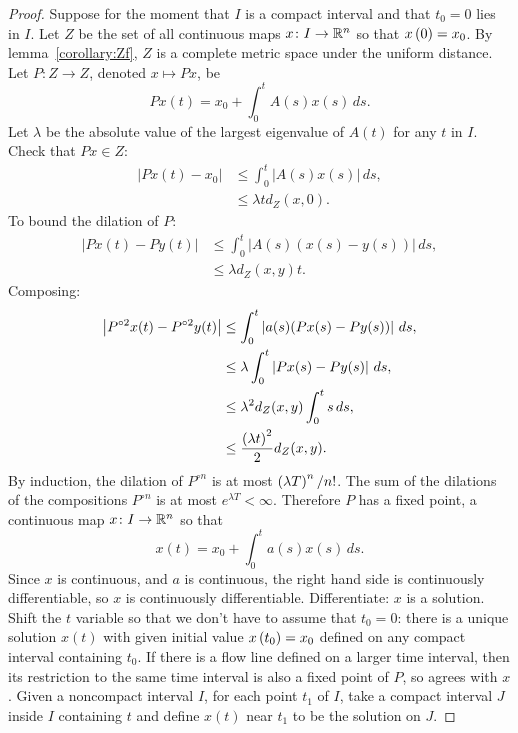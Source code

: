 \begin{proof}
Suppose for the moment that \(I\) is a compact interval and that \(t_0=0\) lies in \(I\).
Let \(Z\) be the set of all continuous maps \(x \colon I \to \mathbb{R}^{n}\) so that \(x\left(0\right)=x_0\).
By lemma~\vref{corollary:Zf}, \(Z\) is a complete metric space under the uniform distance.
Let \(P \colon Z \to Z\), denoted \(x \mapsto Px\), be
\[
Px(t) = x_0 + \int_0^t A(s) x(s) \, ds.
\]
Let \(\lambda\) be the absolute value of the largest eigenvalue of \(A(t)\) for any \(t\) in \(I\).
Check that \(Px \in Z\):
\begin{align*}
\left|Px(t) - x_0\right| 
&
\le
\int_0^t \left|A(s)x(s)\right| \, ds,
\\
&\le
\lambda t d_Z(x,0).
\end{align*}
To bound the dilation of \(P\):
\begin{align*}
\left|Px(t)-Py(t)\right|
&\le
\int_0^t \left|A(s)(x(s)-y(s))\right| \, ds,
\\
&\le
\lambda d_Z(x,y) t.
\end{align*}
Composing:
\begin{align*}
\left|P^{\circ 2}x(t)-P^{\circ 2}y(t)\right|
&\le
\int_0^t \left|a(s)(Px(s)-Py(s))\right| \, ds,
\\
&\le
\lambda \int_0^t \left|Px(s)-Py(s)\right| \, ds,
\\
&\le
\lambda^2 d_Z(x,y) \int_0^t s \, ds,
\\
&\le \frac{\left(\lambda t\right)^2}{2} d_Z(x,y).
\end{align*}
By induction, the dilation of \(P^{\circ n}\) is at most \(\left(\lambda T\right)^n/n!\).
The sum of the dilations of the compositions \(P^{\circ n}\) is at most \(e^{\lambda T} < \infty\).
Therefore \(P\) has a fixed point, a continuous map \(x \colon I \to \mathbb{R}^{n}\) so that 
\[
x(t) = x_0 + \int_0^t a(s)x(s) \, ds.
\]
Since \(x\) is continuous, and \(a\) is continuous, the right hand side is continuously differentiable, so \(x\) is continuously differentiable.
Differentiate: \(x\) is a solution.
Shift the \(t\) variable so that we don't have to assume that \(t_0=0\): there is a unique solution \(x(t)\) with given initial value \(x\left(t_0\right)=x_0\) defined on any compact interval containing \(t_0\).
If there is a flow line defined on a larger time interval, then its restriction to the same time interval is also a fixed point of \(P\), so agrees with \(x\).
Given a noncompact interval \(I\), for each point \(t_1\) of \(I\), take a compact interval \(J\) inside \(I\) containing \(t\) and define \(x(t)\) near \(t_1\) to be the solution on \(J\).
\end{proof}
